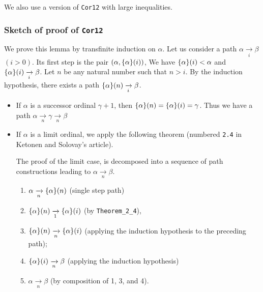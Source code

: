 


We  also use a version of \texttt{Cor12} with large inequalities.





\subsubsection{Sketch of proof of \texttt{Cor12}}

We prove this lemma by transfinite induction on $\alpha$.
Let us consider a path $\alpha \xrightarrow [i]{} \beta$ $(i>0)$. Its first step is
the pair $(\alpha,\mbox{$\{\alpha\}(i)$})$, We have $\mbox{$\{\alpha\}(i)$}<\alpha$ and
$\mbox{$\{\alpha\}(i)$} \xrightarrow [i]{} \beta$. 
Let $n$ be any natural number such that $n>i$.
By the induction hypothesis, there exists a path $\mbox{$\{\alpha\}(n)$} \xrightarrow[i]{} \beta$.
\begin{itemize}
\item  If $\alpha$ is a successor ordinal $\gamma+1$, then $\mbox{$\{\alpha\}(n)$} =
\mbox{$\{\alpha\}(i)$}=\gamma$. Thus we have a path 
$\alpha  \xrightarrow [n]{}  \gamma \xrightarrow [n]{} \beta$
\item If $\alpha$ is a limit ordinal, we apply the following theorem (numbered \texttt{2.4} in Ketonen and Solovay's article). 



  

The proof of the limit case, is decomposed into a sequence
of path constructions leading to $\alpha \xrightarrow[n]{} \beta$.

 \begin{enumerate}
 \item $\alpha \xrightarrow[n]{} \mbox{$\{\alpha\}(n)$}$ (single step path)
 \item $\mbox{$\{\alpha\}(n)$} \xrightarrow[1]{} \mbox{$\{\alpha\}(i)$}$ (by \texttt{Theorem\_2\_4}),
\item $\mbox{$\{\alpha\}(n)$} \xrightarrow[n]{} \mbox{$\{\alpha\}(i)$}$ (applying the induction hypothesis to the preceding path);
\item $\mbox{$\{\alpha\}(i)$} \xrightarrow[n]{} \beta$ (applying the induction hypothesis)
\item $\alpha \xrightarrow[n]{} \beta$ (by composition of 1, 3, and 4).


 \end{enumerate}


\end{itemize}







